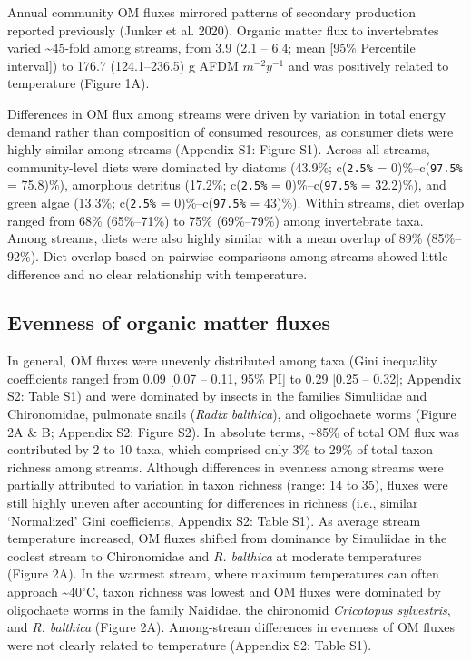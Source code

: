 \documentclass[
]{article}
\numberwithin{equation}
\begin{document}
Annual community OM fluxes mirrored patterns of secondary production
reported previously (Junker et al. 2020). Organic matter flux to
invertebrates varied \textasciitilde45-fold among streams, from 3.9 (2.1
-- 6.4; mean {[}95\% Percentile interval{]}) to 176.7 (124.1--236.5) g
AFDM \(m^{-2} y^{-1}\) and was positively related to temperature (Figure
1A).

Differences in OM flux among streams were driven by variation in total
energy demand rather than composition of consumed resources, as consumer
diets were highly similar among streams (Appendix S1: Figure S1). Across
all streams, community-level diets were dominated by diatoms (43.9\%;
c(\texttt{2.5\%} = 0)\%--c(\texttt{97.5\%} = 75.8)\%), amorphous
detritus (17.2\%; c(\texttt{2.5\%} = 0)\%--c(\texttt{97.5\%} = 32.2)\%),
and green algae (13.3\%; c(\texttt{2.5\%} = 0)\%--c(\texttt{97.5\%} =
43)\%). Within streams, diet overlap ranged from 68\% (65\%--71\%) to
75\% (69\%--79\%) among invertebrate taxa. Among streams, diets were
also highly similar with a mean overlap of 89\% (85\%--92\%). Diet
overlap based on pairwise comparisons among streams showed little
difference and no clear relationship with temperature.

\hypertarget{evenness-of-organic-matter-fluxes}{%
\subsection{Evenness of organic matter
fluxes}\label{evenness-of-organic-matter-fluxes}}

In general, OM fluxes were unevenly distributed among taxa (Gini
inequality coefficients ranged from 0.09 {[}0.07 -- 0.11, 95\% PI{]} to
0.29 {[}0.25 -- 0.32{]}; Appendix S2: Table S1) and were dominated by
insects in the families Simuliidae and Chironomidae, pulmonate snails
(\emph{Radix balthica}), and oligochaete worms (Figure 2A \& B; Appendix
S2: Figure S2). In absolute terms, \textasciitilde85\% of total OM flux
was contributed by 2 to 10 taxa, which comprised only 3\% to 29\% of
total taxon richness among streams. Although differences in evenness
among streams were partially attributed to variation in taxon richness
(range: 14 to 35), fluxes were still highly uneven after accounting for
differences in richness (i.e., similar `Normalized' Gini coefficients,
Appendix S2: Table S1). As average stream temperature increased, OM
fluxes shifted from dominance by Simuliidae in the coolest stream to
Chironomidae and \emph{R. balthica} at moderate temperatures (Figure
2A). In the warmest stream, where maximum temperatures can often
approach \textasciitilde40\(^\circ\)C, taxon richness was lowest and OM
fluxes were dominated by oligochaete worms in the family Naididae, the
chironomid \emph{Cricotopus sylvestris}, and \emph{R. balthica} (Figure
2A). Among-stream differences in evenness of OM fluxes were not clearly
related to temperature (Appendix S2: Table S1).
\end{document}
